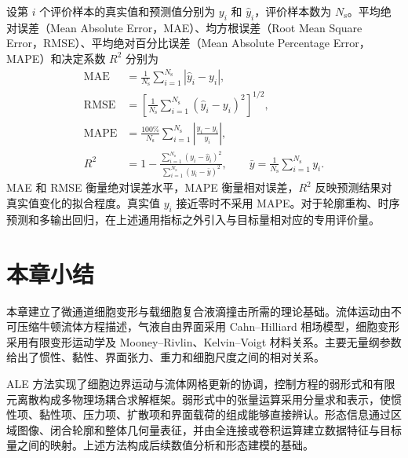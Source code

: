 设第 $i$ 个评价样本的真实值和预测值分别为 $y_i$ 和 $\widehat y_i$，评价样本数为 $N_{\mathrm s}$。平均绝对误差（Mean Absolute Error，MAE）、均方根误差（Root Mean Square Error，RMSE）、平均绝对百分比误差（Mean Absolute Percentage Error，MAPE）和决定系数 $R^2$ 分别为
\begin{align}
\mathrm{MAE}
&=
\frac{1}{N_{\mathrm s}}
\sum_{i=1}^{N_{\mathrm s}}
\left|\widehat y_i-y_i\right|,
\label{eq:ch2_mae}\\
\mathrm{RMSE}
&=
\left[
\frac{1}{N_{\mathrm s}}
\sum_{i=1}^{N_{\mathrm s}}
\left(\widehat y_i-y_i\right)^2
\right]^{1/2},
\label{eq:ch2_rmse}\\
\mathrm{MAPE}
&=
\frac{100\%}{N_{\mathrm s}}
\sum_{i=1}^{N_{\mathrm s}}
\left|
\frac{\widehat y_i-y_i}{y_i}
\right|,
\label{eq:ch2_mape}\\
R^2
&=
1-
\frac{
\sum_{i=1}^{N_{\mathrm s}}
\left(y_i-\widehat y_i\right)^2}
{
\sum_{i=1}^{N_{\mathrm s}}
\left(y_i-\bar y\right)^2},
\qquad
\bar y
=
\frac{1}{N_{\mathrm s}}
\sum_{i=1}^{N_{\mathrm s}}y_i.
\label{eq:ch2_r2}
\end{align}
MAE 和 RMSE 衡量绝对误差水平，MAPE 衡量相对误差，$R^2$ 反映预测结果对真实值变化的拟合程度。真实值 $y_i$ 接近零时不采用 MAPE。对于轮廓重构、时序预测和多输出回归，在上述通用指标之外引入与目标量相对应的专用评价量。

\section{本章小结}
\label{sec:ch2_summary}

本章建立了微通道细胞变形与载细胞复合液滴撞击所需的理论基础。流体运动由不可压缩牛顿流体方程描述，气液自由界面采用 Cahn--Hilliard 相场模型，细胞变形采用有限变形运动学及 Mooney--Rivlin、Kelvin--Voigt 材料关系。主要无量纲参数给出了惯性、黏性、界面张力、重力和细胞尺度之间的相对关系。

ALE 方法实现了细胞边界运动与流体网格更新的协调，控制方程的弱形式和有限元离散构成多物理场耦合求解框架。弱形式中的张量运算采用分量求和表示，使惯性项、黏性项、压力项、扩散项和界面载荷的组成能够直接辨认。形态信息通过区域图像、闭合轮廓和整体几何量表征，并由全连接或卷积运算建立数据特征与目标量之间的映射。上述方法构成后续数值分析和形态建模的基础。
